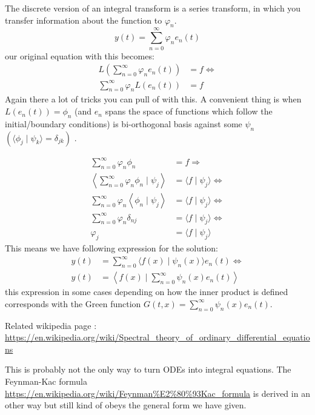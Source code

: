 The discrete version of an integral transform is a series transform,
in which you transfer information about the function to $\varphi_n$.
$$
    y(t) = \sum_{n=0}^{\infty} \varphi_n e_n(t)
$$
our original equation with this becomes:
\begin{align*}
    L \left(\sum_{n=0}^{\infty} \varphi_n e_n(t) \right) & = f \Leftrightarrow \\
    \sum_{n=0}^{\infty} \varphi_n L (e_n(t))             & = f
\end{align*}
Again there a lot of tricks you can pull of with this.
A convenient thing is when $L(e_{n}(t)) = \phi_{n}$ (and $e_{n}$
spans the space of functions which follow the initial/boundary conditions)
is bi-orthogonal basis against some $\psi_n$
$\left(\langle \phi_j \mid \psi_{k} \rangle= \delta_{jk}\right)$ .

\begin{align*}
    \sum_{n=0}^{\infty} \varphi_n \phi_{n}                                            & = f \Rightarrow                                   \\
    \left \langle \sum_{n=0}^{\infty} \varphi_n \phi_{n}\mid \psi_{j}  \right \rangle & =  \langle f\mid \psi_{j} \rangle \Leftrightarrow \\
    \sum_{n=0}^{\infty} \varphi_n \left \langle \phi_{n}\mid \psi_{j}  \right \rangle & =  \langle f\mid \psi_{j} \rangle \Leftrightarrow \\
    \sum_{n=0}^{\infty} \varphi_n \delta_{nj}                                         & =  \langle f\mid \psi_{j} \rangle \Leftrightarrow \\
    \varphi_j                                                                         & =  \langle f\mid \psi_{j} \rangle
\end{align*}
This means we have following expression for the solution:
\begin{align*}
    y(t) & = \sum_{n=0}^{\infty} \langle f(x)\mid \psi_{n}(x) \rangle e_{n}(t)  \Leftrightarrow \\
    y(t) & = \left\langle f(x)\mid  \sum_{n=0}^{\infty} \psi_{n}(x)e_{n}(t)  \right \rangle
\end{align*}
this expression in some cases depending on how the inner product is defined corresponds
with the Green function $G(t,x) =\sum_{n=0}^{\infty} \psi_{n}(x)e_{n}(t)$.

Related wikipedia page :
\url{https://en.wikipedia.org/wiki/Spectral_theory_of_ordinary_differential_equations}

This is probably not the only way to turn ODEs into integral equations. The Feynman-Kac formula
\url{https://en.wikipedia.org/wiki/Feynman%E2%80%93Kac_formula} 
is derived in an other way but still kind of obeys the general form we have given.

